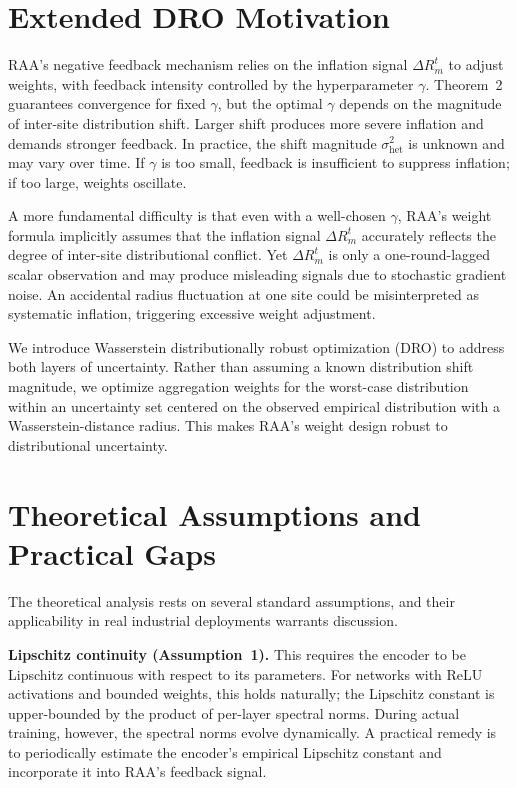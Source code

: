 \documentclass[10pt,journal,compsoc]{IEEEtran}
\begin{document}
\section{Extended DRO Motivation}
\label{sup:dro-motivation}

RAA's negative feedback mechanism relies on the inflation signal $\Delta R_m^t$ to adjust weights, with feedback intensity controlled by the hyperparameter $\gamma$. Theorem~2 guarantees convergence for fixed $\gamma$, but the optimal $\gamma$ depends on the magnitude of inter-site distribution shift. Larger shift produces more severe inflation and demands stronger feedback. In practice, the shift magnitude $\sigma_{\mathrm{het}}^2$ is unknown and may vary over time. If $\gamma$ is too small, feedback is insufficient to suppress inflation; if too large, weights oscillate.

A more fundamental difficulty is that even with a well-chosen $\gamma$, RAA's weight formula implicitly assumes that the inflation signal $\Delta R_m^t$ accurately reflects the degree of inter-site distributional conflict. Yet $\Delta R_m^t$ is only a one-round-lagged scalar observation and may produce misleading signals due to stochastic gradient noise. An accidental radius fluctuation at one site could be misinterpreted as systematic inflation, triggering excessive weight adjustment.

We introduce Wasserstein distributionally robust optimization (DRO) to address both layers of uncertainty. Rather than assuming a known distribution shift magnitude, we optimize aggregation weights for the worst-case distribution within an uncertainty set centered on the observed empirical distribution with a Wasserstein-distance radius. This makes RAA's weight design robust to distributional uncertainty.


\section{Theoretical Assumptions and Practical Gaps}
\label{sup:assumptions}

The theoretical analysis rests on several standard assumptions, and their applicability in real industrial deployments warrants discussion.

\textbf{Lipschitz continuity (Assumption~1).}
This requires the encoder to be Lipschitz continuous with respect to its parameters. For networks with ReLU activations and bounded weights, this holds naturally; the Lipschitz constant is upper-bounded by the product of per-layer spectral norms. During actual training, however, the spectral norms evolve dynamically. A practical remedy is to periodically estimate the encoder's empirical Lipschitz constant and incorporate it into RAA's feedback signal.
\end{document}
